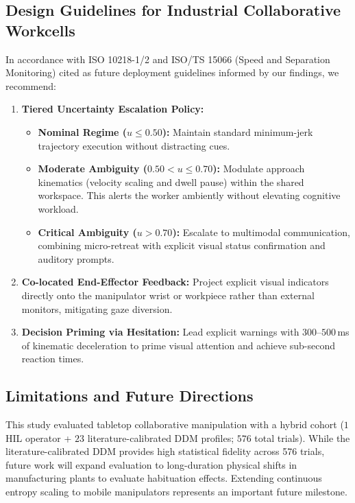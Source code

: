 \documentclass[conference]{IEEEtran}
\begin{document}
\subsection{Design Guidelines for Industrial Collaborative Workcells}
In accordance with ISO 10218-1/2 and ISO/TS 15066 (Speed and Separation Monitoring) cited as future deployment guidelines informed by our findings, we recommend:
\begin{enumerate}
    \item \textbf{Tiered Uncertainty Escalation Policy:}
    \begin{itemize}
        \item \textbf{Nominal Regime ($u \le 0.50$):} Maintain standard minimum-jerk trajectory execution without distracting cues.
        \item \textbf{Moderate Ambiguity ($0.50 < u \le 0.70$):} Modulate approach kinematics (velocity scaling and dwell pause) within the shared workspace. This alerts the worker ambiently without elevating cognitive workload.
        \item \textbf{Critical Ambiguity ($u > 0.70$):} Escalate to multimodal communication, combining micro-retreat with explicit visual status confirmation and auditory prompts.
    \end{itemize}
    \item \textbf{Co-located End-Effector Feedback:} Project explicit visual indicators directly onto the manipulator wrist or workpiece rather than external monitors, mitigating gaze diversion.
    \item \textbf{Decision Priming via Hesitation:} Lead explicit warnings with $300\text{--}500$\,ms of kinematic deceleration to prime visual attention and achieve sub-second reaction times.
\end{enumerate}

\subsection{Limitations and Future Directions}
This study evaluated tabletop collaborative manipulation with a hybrid cohort ($1$ HIL operator + $23$ literature-calibrated DDM profiles; $576$ total trials). While the literature-calibrated DDM provides high statistical fidelity across 576 trials, future work will expand evaluation to long-duration physical shifts in manufacturing plants to evaluate habituation effects. Extending continuous entropy scaling to mobile manipulators represents an important future milestone.
\end{document}
